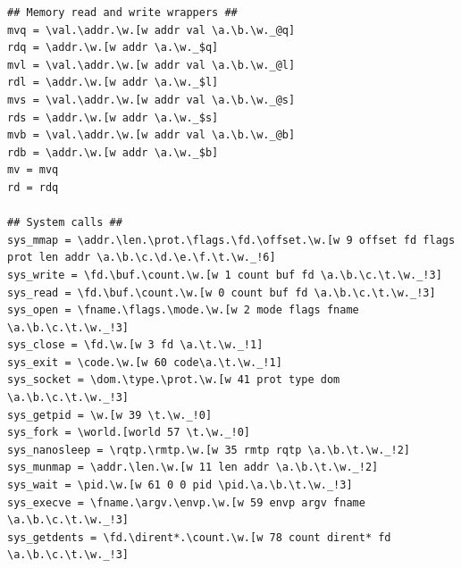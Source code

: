 \begin{verbatim}
## Memory read and write wrappers ##
mvq = \val.\addr.\w.[w addr val \a.\b.\w._@q]
rdq = \addr.\w.[w addr \a.\w._$q]
mvl = \val.\addr.\w.[w addr val \a.\b.\w._@l]
rdl = \addr.\w.[w addr \a.\w._$l]
mvs = \val.\addr.\w.[w addr val \a.\b.\w._@s]
rds = \addr.\w.[w addr \a.\w._$s]
mvb = \val.\addr.\w.[w addr val \a.\b.\w._@b]
rdb = \addr.\w.[w addr \a.\w._$b]
mv = mvq
rd = rdq

## System calls ##
sys_mmap = \addr.\len.\prot.\flags.\fd.\offset.\w.[w 9 offset fd flags prot len addr \a.\b.\c.\d.\e.\f.\t.\w._!6]
sys_write = \fd.\buf.\count.\w.[w 1 count buf fd \a.\b.\c.\t.\w._!3]
sys_read = \fd.\buf.\count.\w.[w 0 count buf fd \a.\b.\c.\t.\w._!3]
sys_open = \fname.\flags.\mode.\w.[w 2 mode flags fname \a.\b.\c.\t.\w._!3]
sys_close = \fd.\w.[w 3 fd \a.\t.\w._!1]
sys_exit = \code.\w.[w 60 code\a.\t.\w._!1]
sys_socket = \dom.\type.\prot.\w.[w 41 prot type dom \a.\b.\c.\t.\w._!3]
sys_getpid = \w.[w 39 \t.\w._!0]
sys_fork = \world.[world 57 \t.\w._!0]
sys_nanosleep = \rqtp.\rmtp.\w.[w 35 rmtp rqtp \a.\b.\t.\w._!2]
sys_munmap = \addr.\len.\w.[w 11 len addr \a.\b.\t.\w._!2]
sys_wait = \pid.\w.[w 61 0 0 pid \pid.\a.\b.\t.\w._!3]
sys_execve = \fname.\argv.\envp.\w.[w 59 envp argv fname \a.\b.\c.\t.\w._!3]
sys_getdents = \fd.\dirent*.\count.\w.[w 78 count dirent* fd \a.\b.\c.\t.\w._!3]


\end{verbatim}
